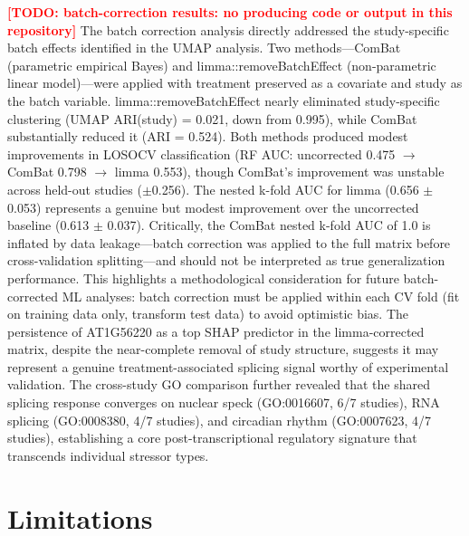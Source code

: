 \documentclass[12pt,a4paper]{article}
\newcommand{\TODO}[1]{\textcolor{red}{\textbf{[TODO: #1]}}}
\begin{document}
\TODO{batch-correction results: no producing code or output in this repository} The batch correction analysis directly addressed the study-specific batch effects identified in the UMAP analysis. Two methods---ComBat (parametric empirical Bayes) and limma::removeBatchEffect (non-parametric linear model)---were applied with treatment preserved as a covariate and study as the batch variable. limma::removeBatchEffect nearly eliminated study-specific clustering (UMAP ARI(study) = 0.021, down from 0.995), while ComBat substantially reduced it (ARI = 0.524). Both methods produced modest improvements in LOSOCV classification (RF AUC: uncorrected 0.475 $\rightarrow$ ComBat 0.798 $\rightarrow$ limma 0.553), though ComBat's improvement was unstable across held-out studies ($\pm$0.256). The nested k-fold AUC for limma (0.656 $\pm$ 0.053) represents a genuine but modest improvement over the uncorrected baseline (0.613 $\pm$ 0.037). Critically, the ComBat nested k-fold AUC of 1.0 is inflated by data leakage---batch correction was applied to the full matrix before cross-validation splitting---and should not be interpreted as true generalization performance. This highlights a methodological consideration for future batch-corrected ML analyses: batch correction must be applied within each CV fold (fit on training data only, transform test data) to avoid optimistic bias. The persistence of AT1G56220 as a top SHAP predictor in the limma-corrected matrix, despite the near-complete removal of study structure, suggests it may represent a genuine treatment-associated splicing signal worthy of experimental validation. The cross-study GO comparison further revealed that the shared splicing response converges on nuclear speck (GO:0016607, 6/7 studies), RNA splicing (GO:0008380, 4/7 studies), and circadian rhythm (GO:0007623, 4/7 studies), establishing a core post-transcriptional regulatory signature that transcends individual stressor types.

\section{Limitations}
\end{document}
